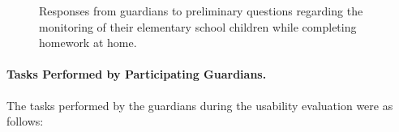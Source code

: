\begin{figure}[h]
\begin{minipage}{0.45\textwidth}
                        \label{fig:monitoring-frequency}
                    \end{minipage}
                    \begin{minipage}{0.45\textwidth}
                        \centering
                        \label{fig:concentration-strategies}
                    \end{minipage}
                    \caption{Responses from guardians to preliminary questions regarding the monitoring of their elementary school children while completing homework at home.}
                    \label{fig:previous-questions}
                \end{figure}
                
                \paragraph{Tasks Performed by Participating Guardians.}
                The tasks performed by the guardians during the usability evaluation were as follows:
                
